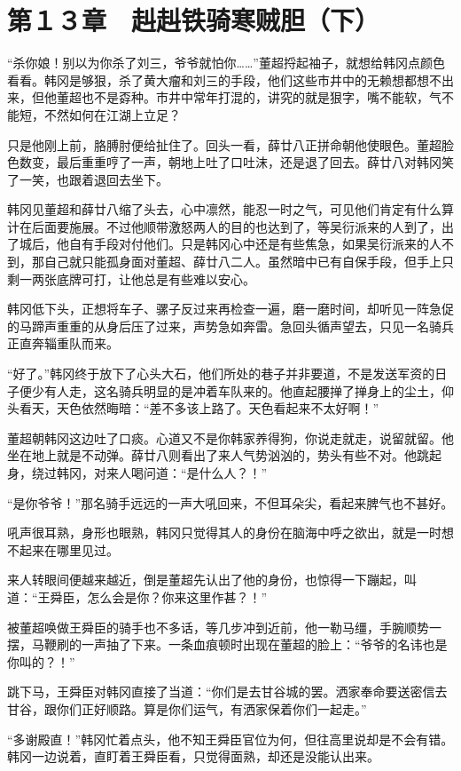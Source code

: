 \section{第１３章　赳赳铁骑寒贼胆（下）}

“杀你娘！别以为你杀了刘三，爷爷就怕你……”董超捋起袖子，就想给韩冈点颜色看看。韩冈是够狠，杀了黄大瘤和刘三的手段，他们这些市井中的无赖想都想不出来，但他董超也不是孬种。市井中常年打混的，讲究的就是狠字，嘴不能软，气不能短，不然如何在江湖上立足？

只是他刚上前，胳膊肘便给扯住了。回头一看，薛廿八正拼命朝他使眼色。董超脸色数变，最后重重哼了一声，朝地上吐了口吐沫，还是退了回去。薛廿八对韩冈笑了一笑，也跟着退回去坐下。

韩冈见董超和薛廿八缩了头去，心中凛然，能忍一时之气，可见他们肯定有什么算计在后面要施展。不过他顺带激怒两人的目的也达到了，等吴衍派来的人到了，出了城后，他自有手段对付他们。只是韩冈心中还是有些焦急，如果吴衍派来的人不到，那自己就只能孤身面对董超、薛廿八二人。虽然暗中已有自保手段，但手上只剩一两张底牌可打，让他总是有些难以安心。

韩冈低下头，正想将车子、骡子反过来再检查一遍，磨一磨时间，却听见一阵急促的马蹄声重重的从身后压了过来，声势急如奔雷。急回头循声望去，只见一名骑兵正直奔辎重队而来。

“好了。”韩冈终于放下了心头大石，他们所处的巷子并非要道，不是发送军资的日子便少有人走，这名骑兵明显的是冲着车队来的。他直起腰掸了掸身上的尘土，仰头看天，天色依然晦暗：“差不多该上路了。天色看起来不太好啊！”

董超朝韩冈这边吐了口痰。心道又不是你韩家养得狗，你说走就走，说留就留。他坐在地上就是不动弹。薛廿八则看出了来人气势汹汹的，势头有些不对。他跳起身，绕过韩冈，对来人喝问道：“是什么人？！”

“是你爷爷！”那名骑手远远的一声大吼回来，不但耳朵尖，看起来脾气也不甚好。

吼声很耳熟，身形也眼熟，韩冈只觉得其人的身份在脑海中呼之欲出，就是一时想不起来在哪里见过。

来人转眼间便越来越近，倒是董超先认出了他的身份，也惊得一下蹦起，叫道：“王舜臣，怎么会是你？你来这里作甚？！”

被董超唤做王舜臣的骑手也不多话，等几步冲到近前，他一勒马缰，手腕顺势一摆，马鞭刷的一声抽了下来。一条血痕顿时出现在董超的脸上：“爷爷的名讳也是你叫的？！”

跳下马，王舜臣对韩冈直接了当道：“你们是去甘谷城的罢。洒家奉命要送密信去甘谷，跟你们正好顺路。算是你们运气，有洒家保着你们一起走。”

“多谢殿直！”韩冈忙着点头，他不知王舜臣官位为何，但往高里说却是不会有错。韩冈一边说着，直盯着王舜臣看，只觉得面熟，却还是没能认出来。

